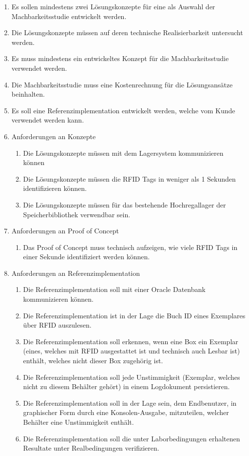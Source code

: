 \begin{enumerate}
	\item Es sollen mindestens zwei Lösungskonzepte für eine als Auswahl der Machbarkeitsstudie entwickelt werden.
	\item Die Lösungskonzepte müssen auf deren technische Realisierbarkeit untersucht werden.
	\item Es muss mindestens ein entwickeltes Konzept für die Machbarkeitsstudie verwendet werden.
	\item Die Machbarkeitsstudie muss eine Kostenrechnung für die Lösungsansätze beinhalten.
	\item Es soll eine Referenzimplementation entwickelt werden, welche vom Kunde verwendet werden kann.
	
	\item Anforderungen an Konzepte
	\begin{enumerate}
		\item Die Lösungskonzepte müssen mit dem Lagersystem kommunizieren können
		\item Die Lösungskonzepte müssen die RFID Tags in weniger als 1 Sekunden identifizieren können.
		\item Die Lösungskonzepte müssen für das bestehende Hochregallager der Speicherbibliothek verwendbar sein.
	\end{enumerate}
	\item Anforderungen an Proof of Concept
	\begin{enumerate}
		\item Das Proof of Concept muss technisch aufzeigen, wie viele RFID Tags in einer Sekunde identifiziert werden können.
	\end{enumerate}
	\item Anforderungen an Referenzimplementation
	\begin{enumerate}
		\item Die Referenzimplementation soll mit einer Oracle Datenbank kommunizieren können.
		\item Die Referenzimplementation ist in der Lage die Buch ID eines Exemplares über RFID auszulesen.
		\item Die Referenzimplementation soll erkennen, wenn eine Box ein Exemplar (eines, welches mit RFID ausgestattet ist und technisch auch Lesbar ist) enthält, welches nicht dieser Box zugehörig ist.
		\item Die Referenzimplementation soll jede Unstimmigkeit (Exemplar, welches nicht zu diesem Behälter gehört) in einem Logdokument persistieren.
		\item Die Referenzimplementation soll in der Lage sein, dem Endbenutzer, in graphischer Form durch eine Konsolen-Ausgabe, mitzuteilen, welcher Behälter eine Unstimmigkeit enthält.
		\item Die Referenzimplementation soll die unter Laborbedingungen erhaltenen Resultate unter Realbedingungen verifizieren.
	\end{enumerate}
\end{enumerate}

